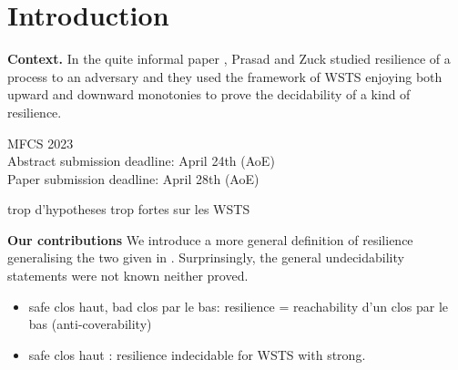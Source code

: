 \section{Introduction}\label{section introduction}


{\bf Context.} In the quite informal paper \cite{DBLP:journals/corr/PrasadZ16}, Prasad and Zuck studied resilience of a process to an adversary and they used the framework of WSTS enjoying both upward and downward monotonies to prove the decidability of a kind of resilience.

MFCS 2023 \\
Abstract submission deadline:    	April 24th (AoE) \\
Paper submission deadline:    	April 28th (AoE)

trop d'hypotheses trop fortes sur les WSTS

{\bf Our contributions}
We introduce a more general definition of resilience generalising the two given in \cite{DBLP:conf/gg/Ozkan22}.
Surprinsingly, the general undecidability statements were not known neither proved.

\begin{itemize}

\item safe clos haut, bad clos par le bas: resilience = reachability d'un clos par le bas (anti-coverability)

\item safe clos haut : resilience indecidable for WSTS with strong.

\end{itemize}